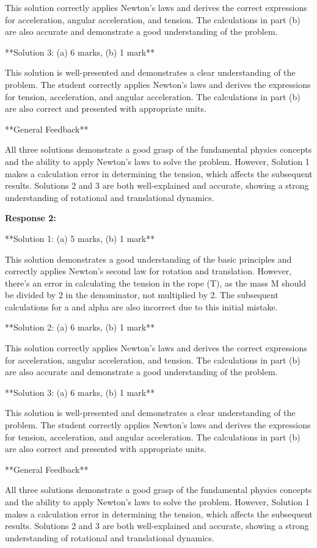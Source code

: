 \documentclass[a4paper,11pt]{article}
\begin{document}
This solution correctly applies Newton's laws and derives the correct expressions for acceleration, angular acceleration, and tension. The calculations in part (b) are also accurate and demonstrate a good understanding of the problem.

**Solution 3: (a) 6 marks, (b) 1 mark**

This solution is well-presented and demonstrates a clear understanding of the problem. The student correctly applies Newton's laws and derives the expressions for tension, acceleration, and angular acceleration. The calculations in part (b) are also correct and presented with appropriate units.

**General Feedback**

All three solutions demonstrate a good grasp of the fundamental physics concepts and the ability to apply Newton's laws to solve the problem. However, Solution 1 makes a calculation error in determining the tension, which affects the subsequent results. Solutions 2 and 3 are both well-explained and accurate, showing a strong understanding of rotational and translational dynamics.

\bigskip    
\textbf{Response 2:}

**Solution 1: (a) 5 marks, (b) 1 mark**

This solution demonstrates a good understanding of the basic principles and correctly applies Newton's second law for rotation and translation. However, there's an error in calculating the tension in the rope (T), as the mass M should be divided by 2 in the denominator, not multiplied by 2. The subsequent calculations for a and alpha are also incorrect due to this initial mistake.

**Solution 2: (a) 6 marks, (b) 1 mark**

This solution correctly applies Newton's laws and derives the correct expressions for acceleration, angular acceleration, and tension. The calculations in part (b) are also accurate and demonstrate a good understanding of the problem.

**Solution 3: (a) 6 marks, (b) 1 mark**

This solution is well-presented and demonstrates a clear understanding of the problem. The student correctly applies Newton's laws and derives the expressions for tension, acceleration, and angular acceleration. The calculations in part (b) are also correct and presented with appropriate units.

**General Feedback**

All three solutions demonstrate a good grasp of the fundamental physics concepts and the ability to apply Newton's laws to solve the problem. However, Solution 1 makes a calculation error in determining the tension, which affects the subsequent results. Solutions 2 and 3 are both well-explained and accurate, showing a strong understanding of rotational and translational dynamics.
\end{document}
